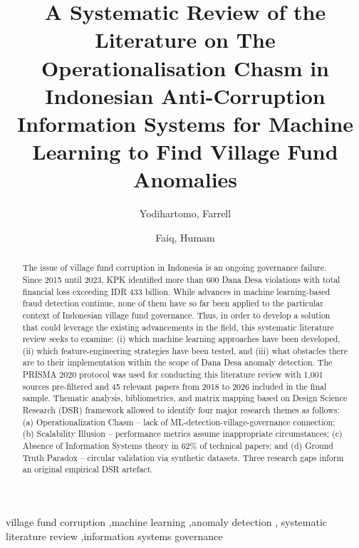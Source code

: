 \documentclass[3p,times,procedia]{elsarticle}
\begin{document}
\begin{frontmatter}


\title{A Systematic Review of the Literature on The Operationalisation Chasm in Indonesian Anti-Corruption Information Systems for Machine Learning to Find Village Fund Anomalies}

\author[a]{Yodihartomo, Farrell}
\author[b]{Faiq, Humam}
\address[a]{Bina Nusantara University}
\address[b]{Komisi Pemberantasan Korupsi}

\begin{abstract}
The issue of village fund corruption in Indonesia is an ongoing governance failure. Since 2015 until 2023, KPK identified more than 600 Dana Desa violations with total financial loss exceeding IDR 433 billion. While advances in machine learning-based fraud detection continue, none of them have so far been applied to the particular context of Indonesian village fund governance. Thus, in order to develop a solution that could leverage the existing advancements in the field, this systematic literature review seeks to examine: (i) which machine learning approaches have been developed, (ii) which feature-engineering strategies have been tested, and (iii) what obstacles there are to their implementation within the scope of Dana Desa anomaly detection. The PRISMA 2020 protocol was used for conducting this literature review with 1,001 sources pre-filtered and 45 relevant papers from 2018 to 2026 included in the final sample. Thematic analysis, bibliometrics, and matrix mapping based on Design Science Research (DSR) framework allowed to identify four major research themes as follows: (a) Operationalization Chasm – lack of ML-detection-village-governance connection; (b) Scalability Illusion – performance metrics assume inappropriate circumstances; (c) Absence of Information Systems theory in 62\% of technical papers; and (d) Ground Truth Paradox – circular validation via synthetic datasets. Three research gaps inform an original empirical DSR artefact.
\end{abstract}

\begin{keyword}
village fund corruption \sep machine learning \sep anomaly detection \sep
systematic literature review \sep information systems governance
\end{keyword}

\end{frontmatter}
\end{document}
